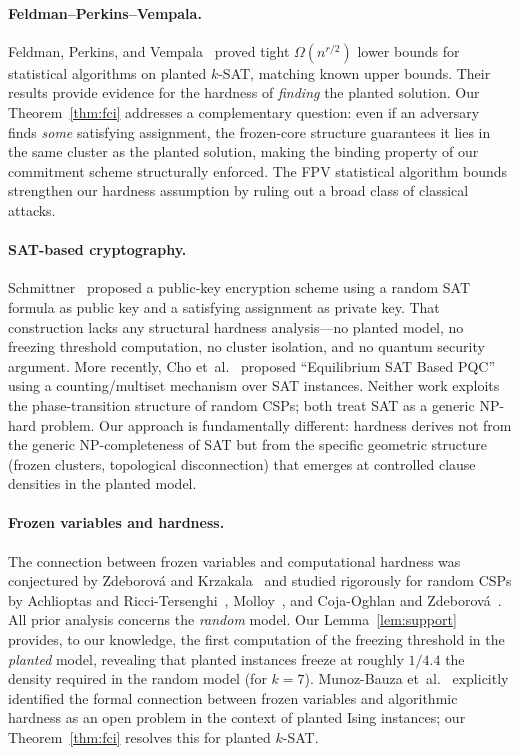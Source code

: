 \documentclass[11pt]{article}
\begin{document}
\paragraph{Feldman--Perkins--Vempala.}
Feldman, Perkins, and Vempala~\cite{FPV18} proved tight $\Omega(n^{r/2})$ lower bounds for statistical algorithms on planted $k$-SAT, matching known upper bounds.  Their results provide evidence for the hardness of \emph{finding} the planted solution.  Our Theorem~\ref{thm:fci} addresses a complementary question: even if an adversary finds \emph{some} satisfying assignment, the frozen-core structure guarantees it lies in the same cluster as the planted solution, making the binding property of our commitment scheme structurally enforced.  The FPV statistical algorithm bounds strengthen our hardness assumption by ruling out a broad class of classical attacks.

\paragraph{SAT-based cryptography.}
Schmittner~\cite{Sch15} proposed a public-key encryption scheme using a random SAT formula as public key and a satisfying assignment as private key.  That construction lacks any structural hardness analysis---no planted model, no freezing threshold computation, no cluster isolation, and no quantum security argument.  More recently, Cho et~al.~\cite{Cho25} proposed ``Equilibrium SAT Based PQC'' using a counting/multiset mechanism over SAT instances.  Neither work exploits the phase-transition structure of random CSPs; both treat SAT as a generic NP-hard problem.  Our approach is fundamentally different: hardness derives not from the generic NP-completeness of SAT but from the specific geometric structure (frozen clusters, topological disconnection) that emerges at controlled clause densities in the planted model.

\paragraph{Frozen variables and hardness.}
The connection between frozen variables and computational hardness was conjectured by Zdeborov\'{a} and Krzakala~\cite{ZK07} and studied rigorously for random CSPs by Achlioptas and Ricci-Tersenghi~\cite{ART09}, Molloy~\cite{Mol12}, and Coja-Oghlan and Zdeborov\'{a}~\cite{CZ12}.  All prior analysis concerns the \emph{random} model.  Our Lemma~\ref{lem:support} provides, to our knowledge, the first computation of the freezing threshold in the \emph{planted} model, revealing that planted instances freeze at roughly $1/4.4$ the density required in the random model (for $k = 7$).  Munoz-Bauza et~al.~\cite{MMRE23} explicitly identified the formal connection between frozen variables and algorithmic hardness as an open problem in the context of planted Ising instances; our Theorem~\ref{thm:fci} resolves this for planted $k$-SAT.
\end{document}
